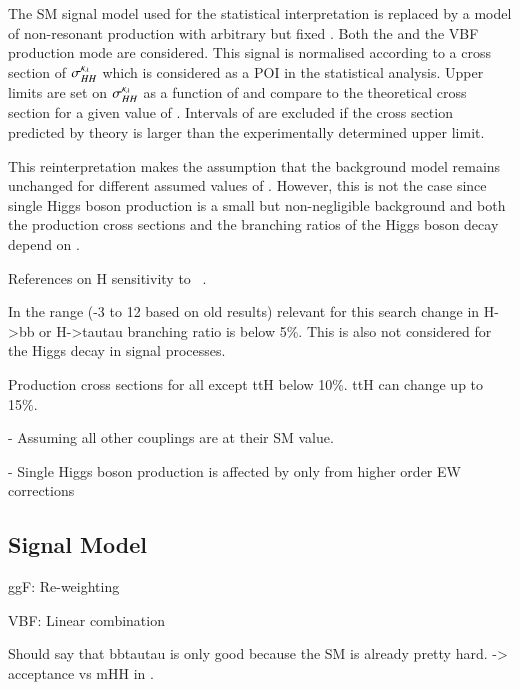 The SM \HH signal model used for the statistical interpretation is
replaced by a model of non-resonant \HH production with arbitrary but
fixed \klambda. Both the \ggF and the VBF production mode are
considered. This signal is normalised according to a cross section of
$\sigma_{HH}^{\kappa_{\lambda}}$ which is considered as a POI in the
statistical analysis. Upper limits are set on $\sigma_{HH}^{\kappa_{\lambda}}$
as a function of \klambda and compare to the theoretical cross section
for a given value of \klambda. Intervals of \klambda are excluded if
the cross section predicted by theory is larger than the
experimentally determined upper limit.

This reinterpretation makes the assumption that the background model
remains unchanged for different assumed values of \klambda. However,
this is not the case since single Higgs boson production is a small
but non-negligible background and both the production cross sections
and the branching ratios of the Higgs boson decay depend on \klambda.

References on H sensitivity to
\klambda~\cite{ATL-PHYS-PUB-2019-009,Degrassi:2016wml,Maltoni:2017ims}.

In the \klambda range (-3 to 12 based on old results) relevant for
this search change in H->bb or H->tautau branching ratio is below
5\%. This is also not considered for the Higgs decay in signal
processes.

Production cross sections for all except ttH below 10\%. ttH can
change up to 15\%.

- Assuming all other couplings are at their SM value.

- Single Higgs boson production is affected by \klambda only from
higher order EW corrections


\subsection{Signal Model}


ggF: Re-weighting

VBF: Linear combination



Should say that bbtautau is only good because the SM is already pretty
hard. -> acceptance vs mHH in \hadhad.


